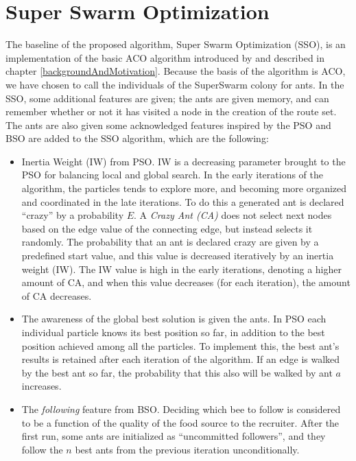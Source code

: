 \section{Super Swarm Optimization}

The baseline of the proposed algorithm, Super Swarm Optimization (SSO), is an implementation of the basic ACO algorithm introduced by \citet{nanda11} and described in chapter \vref{backgroundAndMotivation}. Because the basis of the algorithm is ACO, we have chosen to call the individuals of the SuperSwarm colony for ants. %
In the SSO, some additional features are given; the ants are given memory, and can remember whether or not it has visited a node in the creation of the route set. The ants are also given some acknowledged features inspired by the PSO and BSO are added to the SSO algorithm, which are the following:

\begin{itemize}
\item Inertia Weight (IW) from PSO. IW is a decreasing parameter brought to the PSO for balancing local and global search. In the early iterations of the algorithm, the particles tends to explore more, and becoming more organized and coordinated in the late iterations. To do this a generated ant is declared ``crazy'' by a probability $E$. A \textit{Crazy Ant (CA)} does not select next nodes based on the edge value of the connecting edge, but instead selects it randomly. The probability that an ant is declared crazy are given by a predefined start value, and this value is decreased iteratively by an inertia weight (IW). The IW value is high in the early iterations, denoting a higher amount of CA, and when this value decreases (for each iteration), the amount of CA decreases.
\item The awareness of the global best solution is given the ants. In PSO each individual particle knows its best position so far, in addition to the best position achieved among all the particles. To implement this, the best ant's results is retained after each iteration of the algorithm. If an edge is walked by the best ant so far, the probability that this also will be walked by ant $a$ increases.
\item The \textit{following} feature from BSO. Deciding which bee to follow is considered to be a function of the quality of the food source to the recruiter. After the first run, some ants are initialized as ``uncommitted followers'', and they follow the $n$ best ants from the previous iteration unconditionally.
\end{itemize}


